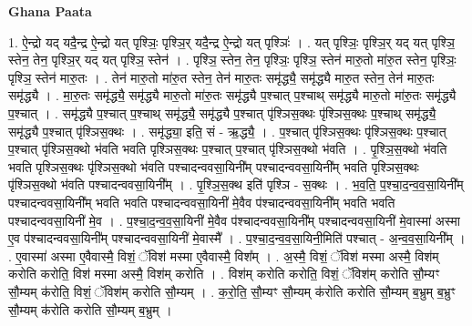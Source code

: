 \documentclass[17pt]{extarticle}
\begin{document}
\textbf{Ghana Paata } \newline

1. ऐ॒न्द्रो यद् यदै॒न्द्र ऐ॒न्द्रो यत् पृश्ञिः॒ पृश्ञि॒र् यदै॒न्द्र ऐ॒न्द्रो यत् पृश्ञिः॑ । . यत् पृश्ञिः॒ पृश्ञि॒र् यद् यत् पृश्ञि॒ स्तेन॒ तेन॒ पृश्ञि॒र् यद् यत् पृश्ञि॒ स्तेन॑ । . पृश्ञि॒ स्तेन॒ तेन॒ पृश्ञिः॒ पृश्ञि॒ स्तेन॑ मारु॒तो मा॑रु॒त स्तेन॒ पृश्ञिः॒ पृश्ञि॒ स्तेन॑ मारु॒तः । . तेन॑ मारु॒तो मा॑रु॒त स्तेन॒ तेन॑ मारु॒तः समृ॑द्ध्यै॒ समृ॑द्ध्यै मारु॒त स्तेन॒ तेन॑ मारु॒तः समृ॑द्ध्यै । . मा॒रु॒तः समृ॑द्ध्यै॒ समृ॑द्ध्यै मारु॒तो मा॑रु॒तः समृ॑द्ध्यै प॒श्चात् प॒श्चाथ् समृ॑द्ध्यै मारु॒तो मा॑रु॒तः समृ॑द्ध्यै प॒श्चात् । . समृ॑द्ध्यै प॒श्चात् प॒श्चाथ् समृ॑द्ध्यै॒ समृ॑द्ध्यै प॒श्चात् पृ॑श्ञिस॒क्थः पृ॑श्ञिस॒क्थः प॒श्चाथ् समृ॑द्ध्यै॒ समृ॑द्ध्यै प॒श्चात् पृ॑श्ञिस॒क्थः । . समृ॑द्ध्या॒ इति॒ सं - ऋ॒द्ध्यै॒ । . प॒श्चात् पृ॑श्ञिस॒क्थः पृ॑श्ञिस॒क्थः प॒श्चात् प॒श्चात् पृ॑श्ञिस॒क्थो भ॑वति भवति पृश्ञिस॒क्थः प॒श्चात् प॒श्चात् पृ॑श्ञिस॒क्थो भ॑वति । . पृ॒श्ञि॒स॒क्थो भ॑वति भवति पृश्ञिस॒क्थः पृ॑श्ञिस॒क्थो भ॑वति पश्चादन्ववसा॒यिनी᳚म् पश्चादन्ववसा॒यिनी᳚म् भवति पृश्ञिस॒क्थः पृ॑श्ञिस॒क्थो भ॑वति पश्चादन्ववसा॒यिनी᳚म् । . पृ॒श्ञि॒स॒क्थ इति॑ पृश्ञि - स॒क्थः । . भ॒व॒ति॒ प॒श्चा॒द॒न्व॒व॒सा॒यिनी᳚म् पश्चादन्ववसा॒यिनी᳚म् भवति भवति पश्चादन्ववसा॒यिनी॑ मे॒वैव प॑श्चादन्ववसा॒यिनी᳚म् भवति भवति पश्चादन्ववसा॒यिनी॑ मे॒व । . प॒श्चा॒द॒न्व॒व॒सा॒यिनी॑ मे॒वैव प॑श्चादन्ववसा॒यिनी᳚म् पश्चादन्ववसा॒यिनी॑ मे॒वास्मा॑ अस्मा ए॒व प॑श्चादन्ववसा॒यिनी᳚म् पश्चादन्ववसा॒यिनी॑ मे॒वास्मै᳚ । . प॒श्चा॒द॒न्व॒व॒सा॒यिनी॒मिति॑ पश्चात् - अ॒न्व॒व॒सा॒यिनी᳚म् । . ए॒वास्मा॑ अस्मा ए॒वैवास्मै॒ विशं॒ ॅविश॑ मस्मा ए॒वैवास्मै॒ विश᳚म् । . अ॒स्मै॒ विशं॒ ॅविश॑ मस्मा अस्मै॒ विश॑म् करोति करोति॒ विश॑ मस्मा अस्मै॒ विश॑म् करोति । . विश॑म् करोति करोति॒ विशं॒ ॅविश॑म् करोति सौ॒म्यꣳ सौ॒म्यम् क॑रोति॒ विशं॒ ॅविश॑म् करोति सौ॒म्यम् । . क॒रो॒ति॒ सौ॒म्यꣳ सौ॒म्यम् क॑रोति करोति सौ॒म्यम् ब॒भ्रुम् ब॒भ्रुꣳ सौ॒म्यम् क॑रोति करोति सौ॒म्यम् ब॒भ्रुम् । \newline
\end{document}
